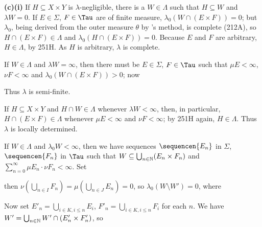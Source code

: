 {\medskip

{\bf (c)(i)} If $H\subseteq X\times Y$ is $\lambda$-negligible, there is
a $W\in\Lambda$ such that $H\subseteq W$ and $\lambda W=0$.   If
$E\in\Sigma$, $F\in\Tau$ are of finite measure,
$\lambda_0(W\cap(E\times  F))=0$;  but $\lambda_0$, being derived from
the outer measure $\theta$
by \Caratheodory's method, is complete (212A), so
$H\cap(E\times F)\in\Lambda$ and $\lambda_0(H\cap(E\times F))=0$.
Because $E$ and $F$
are arbitrary, $H\in\Lambda$, by 251H.   As $H$ is arbitrary, $\lambda$
is complete.

\medskip

 If $W\in\Lambda$ and $\lambda W=\infty$, then there must
be $E\in\Sigma$, $F\in\Tau$ such that $\mu E<\infty$, $\nu F<\infty$ and
$\lambda_0(W\cap(E\times F))>0$;  now


\noindent Thus $\lambda$ is semi-finite.

\medskip

 If $H\subseteq X\times Y$ and $H\cap W\in\Lambda$
whenever $\lambda W<\infty$, then, in particular, $H\cap(E\times
F)\in\Lambda$ whenever $\mu E<\infty$ and $\nu F<\infty$;  by 251H
again, $H\in\Lambda$.   Thus $\lambda$ is locally determined.

\medskip

 If $W\in\Lambda$ and $\lambda_0W<\infty$, then we have
sequences $\sequencen{E_n}$ in $\Sigma$, $\sequencen{F_n}$ in $\Tau$
such
that $W\subseteq\bigcup_{n\in\Bbb N}(E_n\times F_n)$ and
$\sum_{n=0}^{\infty}\mu E_n\cdot\nu F_n<\infty$.   Set


\noindent then $\nu(\bigcup_{n\in I}F_n)=\mu(\bigcup_{n\in J}E_n)=0$, so
$\lambda_0(W\setminus W')=0$, where


\noindent Now set $E'_n=\bigcup_{i\in K,i\le n}E_i$, $F'_n=\bigcup_{i\in
K,i\le n}F_i$ for each $n$.   We have $W'=\bigcup_{n\in\Bbb
N}W'\cap(E'_n\times F'_n)$, so


}
